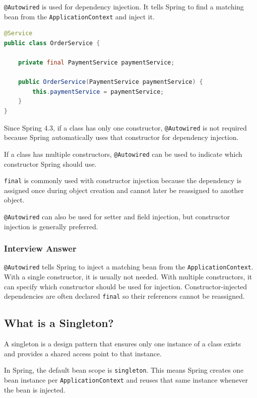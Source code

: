 \documentclass[12pt,a4paper]{article}
\begin{document}
\texttt{@Autowired} is used for dependency injection. It tells Spring to
find a matching bean from the \texttt{ApplicationContext} and inject it.

\begin{lstlisting}[language=Java]
@Service
public class OrderService {

    private final PaymentService paymentService;

    public OrderService(PaymentService paymentService) {
        this.paymentService = paymentService;
    }
}
\end{lstlisting}

Since Spring 4.3, if a class has only one constructor,
\texttt{@Autowired} is not required because Spring automatically uses that
constructor for dependency injection.

If a class has multiple constructors, \texttt{@Autowired} can be used to
indicate which constructor Spring should use.

\texttt{final} is commonly used with constructor injection because the
dependency is assigned once during object creation and cannot later be
reassigned to another object.

\texttt{@Autowired} can also be used for setter and field injection, but
constructor injection is generally preferred.

\subsubsection*{Interview Answer}

\texttt{@Autowired} tells Spring to inject a matching bean from the
\texttt{ApplicationContext}. With a single constructor, it is usually not
needed. With multiple constructors, it can specify which constructor should
be used for injection. Constructor-injected dependencies are often declared
\texttt{final} so their references cannot be reassigned.

\subsection{What is a Singleton?}

A singleton is a design pattern that ensures only one instance of a class
exists and provides a shared access point to that instance.

In Spring, the default bean scope is \texttt{singleton}. This means Spring
creates one bean instance per \texttt{ApplicationContext} and reuses that
same instance whenever the bean is injected.
\end{document}
